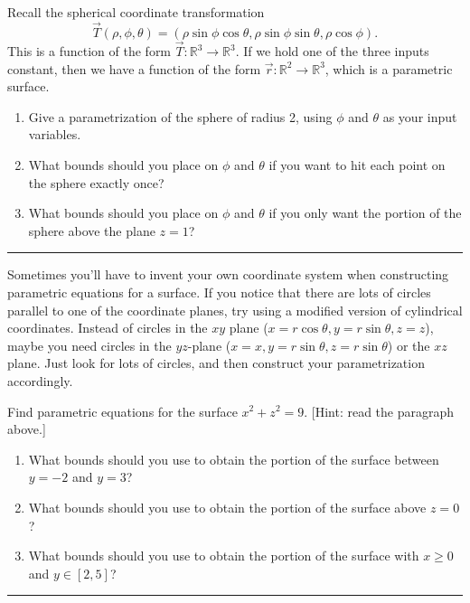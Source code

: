 \begin{problem}%
Recall the spherical coordinate transformation 
$$\vec T(\rho,\phi,\theta) = (\rho\sin\phi\cos \theta, \rho\sin\phi\sin \theta,\rho \cos \phi).$$ 
This is a function of the form $\vec T:\mathbb{R}^3\to\mathbb{R}^3$.  If we hold one of the three inputs constant, then we have a function of the form $\vec r:\mathbb{R}^2\to\mathbb{R}^3$, which is a parametric surface.
\begin{enumerate}
 \item {}%
Give a parametrization of the sphere of radius 2, using $\phi$ and $\theta$ as your input variables. 
 \item What bounds should you place on $\phi$ and $\theta$ if you want to hit each point on the sphere exactly once?
 \item%
%
What bounds should you place on $\phi$ and $\theta$ if you only want the portion of the sphere above the plane $z=1$?
\end{enumerate}
\hrule\end{problem}

Sometimes you'll have to invent your own coordinate system when constructing parametric equations for a surface.  If you notice that there are lots of circles parallel to one of the coordinate planes, try using a modified version of cylindrical coordinates. Instead of circles in the $xy$ plane ($x=r\cos\theta,y=r\sin\theta,z=z$), maybe you need circles in the $yz$-plane ($x=x,y=r\sin\theta,z=r\sin\theta$) or the $xz$ plane.  Just look for lots of circles, and then construct your parametrization accordingly.
\begin{problem}
Find parametric equations for the surface $x^2+z^2=9$. [Hint: read the paragraph above.]  
\begin{enumerate}
 \item{}%
 What bounds should you use to obtain the portion of the surface between $y=-2$ and $y=3$?
 \item What bounds should you use to obtain the portion of the surface above $z=0$?
 \item What bounds should you use to obtain the portion of the surface with $x\geq 0$ and $y\in[2,5]$?
\end{enumerate}
\hrule\end{problem}
